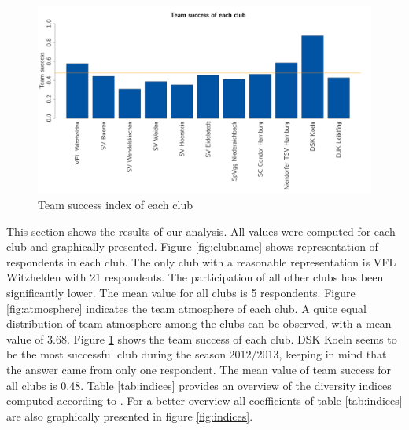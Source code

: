 \documentclass[	
	12pt, %
	a4paper, %
]{scrartcl}\usepackage[]{graphicx}\usepackage[]{color}
\newenvironment{knitrout}{}{} %
\begin{document}
\begin{knitrout}\footnotesize
{}\color{fgcolor}\begin{figure}[]


{\centering \includegraphics[width=1\linewidth]{figure/beamer-teamsuccess} 

}

\caption[Team success index of each club]{Team success index of each club\label{fig:teamsuccess}}
\end{figure}


\end{knitrout}


This section shows the results of our analysis. All values were computed for each club and graphically presented. Figure \ref{fig:clubname} shows representation of respondents in each club. The only club with a reasonable representation is VFL Witzhelden with 21 respondents. The participation of all other clubs has been significantly lower. The mean value for all clubs is 5 respondents. Figure \ref{fig:atmosphere} indicates the team atmosphere of each club. A quite equal distribution of team atmosphere among the clubs can be observed, with a mean value of 3.68. Figure \ref{fig:teamsuccess} shows the team success of each club. DSK Koeln seems to be the most successful club during the season 2012/2013, keeping in mind that the answer came from only one respondent. The mean value of team success for all clubs is 0.48. Table \ref{tab:indices} provides an overview of the diversity indices computed according to . For a better overview all coefficients of table \ref{tab:indices} are also graphically presented in figure \ref{fig:indices}.
\end{document}
